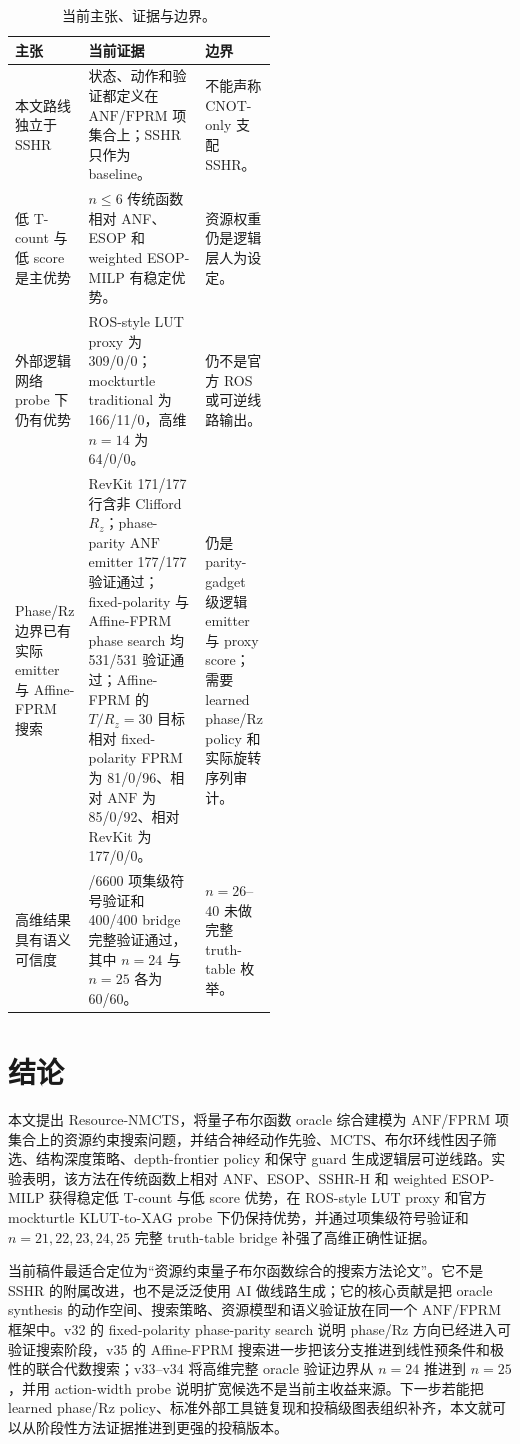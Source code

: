 \documentclass[UTF8,fontset=macnew,11pt]{ctexart}
\newcommand{\method}{Resource-NMCTS}
\newcommand{\anf}{\ensuremath{\mathrm{ANF}}}
\newcommand{\fprm}{\ensuremath{\mathrm{FPRM}}}
\newcommand{\mcts}{\ensuremath{\mathrm{MCTS}}}
\newcommand{\rz}{\ensuremath{R_z}}
\newcommand{\ttable}{truth-table}
\begin{document}
\begin{table}[H]
\centering
\small
\caption{当前主张、证据与边界。}
\label{tab:evidence-map}
\begin{tabularx}{\linewidth}{>{\raggedright\arraybackslash}p{0.27\linewidth}>{\raggedright\arraybackslash}X>{\raggedright\arraybackslash}p{0.25\linewidth}}
\toprule
主张 & 当前证据 & 边界 \\
\midrule
本文路线独立于 SSHR & 状态、动作和验证都定义在 \anf{}/\fprm{} 项集合上；SSHR 只作为 baseline。 & 不能声称 CNOT-only 支配 SSHR。 \\
低 T-count 与低 score 是主优势 & $n\leq6$ 传统函数相对 ANF、ESOP 和 weighted ESOP-MILP 有稳定优势。 & 资源权重仍是逻辑层人为设定。 \\
外部逻辑网络 probe 下仍有优势 & ROS-style LUT proxy 为 309/0/0；mockturtle traditional 为 166/11/0，高维 $n=14$ 为 64/0/0。 & 仍不是官方 ROS 或可逆线路输出。 \\
Phase/Rz 边界已有实际 emitter 与 Affine-FPRM 搜索 & RevKit 171/177 行含非 Clifford \rz{}；phase-parity \anf{} emitter 177/177 验证通过；fixed-polarity 与 Affine-FPRM phase search 均 531/531 验证通过；Affine-FPRM 的 $T/R_z=30$ 目标相对 fixed-polarity FPRM 为 81/0/96、相对 \anf{} 为 85/0/92、相对 RevKit 为 177/0/0。 & 仍是 parity-gadget 级逻辑 emitter 与 proxy score；需要 learned phase/Rz policy 和实际旋转序列审计。 \\
高维结果具有语义可信度 & 6600/6600 项集级符号验证和 400/400 bridge 完整验证通过，其中 $n=24$ 与 $n=25$ 各为 60/60。 & $n=26$--$40$ 未做完整 \ttable{} 枚举。 \\
\bottomrule
\end{tabularx}
\end{table}

\section{结论}

本文提出 \method{}，将量子布尔函数 oracle 综合建模为 \anf{}/\fprm{} 项集合上的资源约束搜索问题，并结合神经动作先验、\mcts{}、布尔环线性因子筛选、结构深度策略、depth-frontier policy 和保守 guard 生成逻辑层可逆线路。实验表明，该方法在传统函数上相对 ANF、ESOP、SSHR-H 和 weighted ESOP-MILP 获得稳定低 T-count 与低 score 优势，在 ROS-style LUT proxy 和官方 mockturtle KLUT-to-XAG probe 下仍保持优势，并通过项集级符号验证和 $n=21,22,23,24,25$ 完整 truth-table bridge 补强了高维正确性证据。

当前稿件最适合定位为“资源约束量子布尔函数综合的搜索方法论文”。它不是 SSHR 的附属改进，也不是泛泛使用 AI 做线路生成；它的核心贡献是把 oracle synthesis 的动作空间、搜索策略、资源模型和语义验证放在同一个 \anf{}/\fprm{} 框架中。v32 的 fixed-polarity phase-parity search 说明 phase/Rz 方向已经进入可验证搜索阶段，v35 的 Affine-FPRM 搜索进一步把该分支推进到线性预条件和极性的联合代数搜索；v33--v34 将高维完整 oracle 验证边界从 $n=24$ 推进到 $n=25$，并用 action-width probe 说明扩宽候选不是当前主收益来源。下一步若能把 learned phase/Rz policy、标准外部工具链复现和投稿级图表组织补齐，本文就可以从阶段性方法证据推进到更强的投稿版本。
\end{document}
